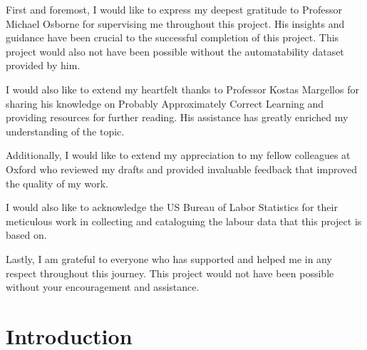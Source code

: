 \documentclass[11pt]{article}
\begin{document}
\thispagestyle{empty}
First and foremost, I would like to express my deepest gratitude to Professor Michael Osborne for supervising me throughout this project. His insights and guidance have been crucial to the successful completion of this project. This project would also not have been possible without the automatability dataset provided by him.

I would also like to extend my heartfelt thanks to Professor Kostas Margellos for sharing his knowledge on Probably Approximately Correct Learning and providing resources for further reading. His assistance has greatly enriched my understanding of the topic.

Additionally, I would like to extend my appreciation to my fellow colleagues at Oxford who reviewed my drafts and provided invaluable feedback that improved the quality of my work. 

I would also like to acknowledge the US Bureau of Labor Statistics for their meticulous work in collecting and cataloguing the labour data that this project is based on.

Lastly, I am grateful to everyone who has supported and helped me in any respect throughout this journey. This project would not have been possible without your encouragement and assistance.

   


\clearpage

\tableofcontents

\clearpage

\section{Introduction}
\label{sec:Introduction}
\end{document}
